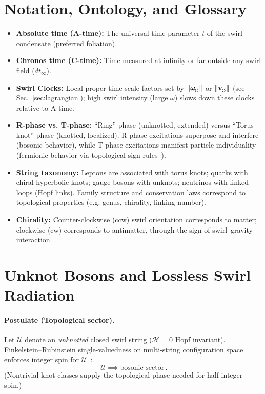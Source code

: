 \documentclass[11pt]{article}
\newcommand{\swirlarrow}{%
     \mathchoice{\mkern-2mu\scriptstyle\boldsymbol{\circlearrowleft}}%
                {\mkern-2mu\scriptstyle\boldsymbol{\circlearrowleft}}%
                {\mkern-2mu\scriptscriptstyle\boldsymbol{\circlearrowleft}}%
                {\mkern-2mu\scriptscriptstyle\boldsymbol{\circlearrowleft}}%
}
\newcommand{\vswirl}{\mathbf{v}_{\swirlarrow}}
\newcommand{\omegas}{\boldsymbol{\omega}_{\swirlarrow}}  %
\begin{document}
\section{Notation, Ontology, and Glossary}
\label{sec:glossary}
\begin{itemize}
\item \textbf{Absolute time (A-time):} The universal time parameter $t$ of the swirl condensate (preferred foliation).
\item \textbf{Chronos time (C-time):} Time measured at infinity or far outside any swirl field ($dt_\infty$).
\item \textbf{Swirl Clocks:} Local proper-time scale factors set by $\|\omegas\|$ or $\|\vswirl\|$ (see Sec.~\ref{sec:lagrangian}); high swirl intensity (large $\omega$) slows down these clocks relative to A-time.
\item \textbf{R-phase vs. T-phase:} ``Ring'' phase (unknotted, extended) versus ``Torus-knot'' phase (knotted, localized). R-phase excitations superpose and interfere (bosonic behavior), while T-phase excitations manifest particle individuality (fermionic behavior via topological sign rules~\cite{FinkelsteinRubinstein1968}).
\item \textbf{String taxonomy:} Leptons are associated with torus knots; quarks with chiral hyperbolic knots; gauge bosons with unknots; neutrinos with linked loops (Hopf links). Family structure and conservation laws correspond to topological properties (e.g. genus, chirality, linking number).
\item \textbf{Chirality:} Counter-clockwise (ccw) swirl orientation corresponds to matter; clockwise (cw) corresponds to antimatter, through the sign of swirl–gravity interaction.
\end{itemize}

\section{Unknot Bosons and Lossless Swirl Radiation}
\label{sec:bosons_photons}
\paragraph{Postulate (Topological sector).}
    Let $\mathcal{U}$ denote an \emph{unknotted} closed swirl string ($\mathcal{H}=0$ Hopf invariant). Finkelstein–Rubinstein single-valuedness on multi-string configuration space enforces integer spin for $\mathcal{U}$~\cite{FinkelsteinRubinstein1968}:
    \[
        \boxed{\,\mathcal{U} \implies \text{bosonic sector}\,.}
    \]
    (Nontrivial knot classes supply the topological phase needed for half-integer spin.)
\end{document}
